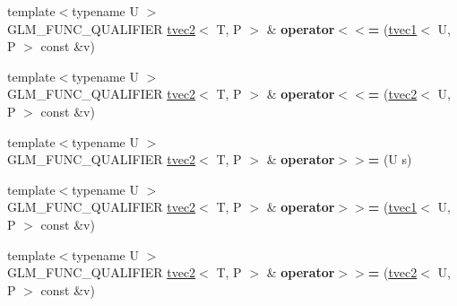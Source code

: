 \begin{DoxyCompactItemize}
\item 
\hypertarget{structglm_1_1tvec2_a4ee968bac5e887631cb05668dd34da58}{{\footnotesize template$<$typename U $>$ }\\G\-L\-M\-\_\-\-F\-U\-N\-C\-\_\-\-Q\-U\-A\-L\-I\-F\-I\-E\-R \hyperlink{structglm_1_1tvec2}{tvec2}$<$ T, P $>$ \& {\bfseries operator$<$$<$=} (\hyperlink{structglm_1_1tvec1}{tvec1}$<$ U, P $>$ const \&v)}\label{structglm_1_1tvec2_a4ee968bac5e887631cb05668dd34da58}

\item 
\hypertarget{structglm_1_1tvec2_adc5cbebcee78fbff8fee4978e4dd8c87}{{\footnotesize template$<$typename U $>$ }\\G\-L\-M\-\_\-\-F\-U\-N\-C\-\_\-\-Q\-U\-A\-L\-I\-F\-I\-E\-R \hyperlink{structglm_1_1tvec2}{tvec2}$<$ T, P $>$ \& {\bfseries operator$<$$<$=} (\hyperlink{structglm_1_1tvec2}{tvec2}$<$ U, P $>$ const \&v)}\label{structglm_1_1tvec2_adc5cbebcee78fbff8fee4978e4dd8c87}

\item 
\hypertarget{structglm_1_1tvec2_a5ccc09976d70b4b868a16efb80a1ec9e}{{\footnotesize template$<$typename U $>$ }\\G\-L\-M\-\_\-\-F\-U\-N\-C\-\_\-\-Q\-U\-A\-L\-I\-F\-I\-E\-R \hyperlink{structglm_1_1tvec2}{tvec2}$<$ T, P $>$ \& {\bfseries operator$>$$>$=} (U s)}\label{structglm_1_1tvec2_a5ccc09976d70b4b868a16efb80a1ec9e}

\item 
\hypertarget{structglm_1_1tvec2_a7c5bc1c8d4d3f176b17cbc50ed99d953}{{\footnotesize template$<$typename U $>$ }\\G\-L\-M\-\_\-\-F\-U\-N\-C\-\_\-\-Q\-U\-A\-L\-I\-F\-I\-E\-R \hyperlink{structglm_1_1tvec2}{tvec2}$<$ T, P $>$ \& {\bfseries operator$>$$>$=} (\hyperlink{structglm_1_1tvec1}{tvec1}$<$ U, P $>$ const \&v)}\label{structglm_1_1tvec2_a7c5bc1c8d4d3f176b17cbc50ed99d953}

\item 
\hypertarget{structglm_1_1tvec2_a6c2dc839f420cba67d7c0dfaab196081}{{\footnotesize template$<$typename U $>$ }\\G\-L\-M\-\_\-\-F\-U\-N\-C\-\_\-\-Q\-U\-A\-L\-I\-F\-I\-E\-R \hyperlink{structglm_1_1tvec2}{tvec2}$<$ T, P $>$ \& {\bfseries operator$>$$>$=} (\hyperlink{structglm_1_1tvec2}{tvec2}$<$ U, P $>$ const \&v)}\label{structglm_1_1tvec2_a6c2dc839f420cba67d7c0dfaab196081}

\end{DoxyCompactItemize}
